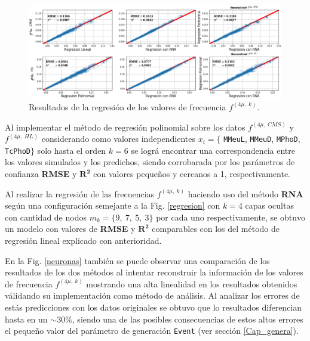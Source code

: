 \begin{figure}[h]
\centering
\includegraphics[width=1\textwidth]{Simulacion/imagenes/ML_Entries.png}
\caption{Resultados de la regresión de los valores de frecuencia $f^{(4\mu,~k)}$.}
\label{regresionALL}
\end{figure}


Al implementar el método de regresión polinomial sobre los datos $f^{(4\mu,~CMS)}$ y $f^{(4\mu,~HL)}$ considerando como valores independientes $x_i=\{$ \texttt{MMeuL}, \texttt{MMeuD}, \texttt{MPhoD}, \texttt{TcPhoD}$\}$ solo hasta el orden $k = 6$ se lográ encontrar una correspondencia entre los valores simulados y los predichos, siendo corrobarada por los parámetros de confianza \textbf{RMSE} y $\mathbf{R^2}$ con valores pequeños y cercanos a 1, respectivamente. 

Al realizar la regresión de las frecuencias $f^{(4\mu,~k)}$ haciendo uso del método \textbf{RNA} según una configuración semejante a la Fig. \ref{regresion} con $k=4$ capas ocultas con cantidad de nodos $m_k=\{9,~7,~5,~3\}$ por cada uno respectivamente, se obtuvo un modelo con valores de \textbf{RMSE} y $\mathbf{R^2}$ comparables con los del método de regresión lineal explicado con anterioridad.

En la Fig. \ref{neuronas} también se puede observar una comparación de los resultados de los dos métodos al intentar reconstruir la información de los valores de frecuencia $f^{(4\mu,~k)}$ mostrando una alta linealidad en los resultados obtenidos válidando su implementación como método de análisis. Al analizar los errores de estás predicciones con los datos originales se obtuvo que lo resultados diferencian hasta en un $\sim 30\%$, siendo una de las posibles consecuencias de estos altos errores el pequeño valor del parámetro de generación \texttt{Event} (ver sección \ref{Cap_genera}).

%








